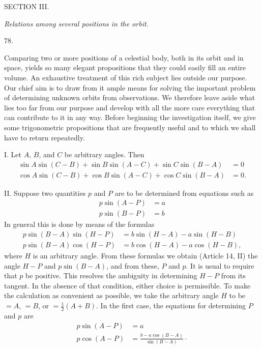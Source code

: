 \clearpage
{}
\begin{center}
{\large SECTION III.}\par\medskip
\emph{Relations among several positions in the orbit.}\par\bigskip
\hypertarget{native-106-article078}{}78.
\end{center}
Comparing two or more positions of a celestial body, both in its orbit and in space, yields so many elegant propositions that they could easily fill an entire volume. An exhaustive treatment of this rich subject lies outside our purpose. Our chief aim is to draw from it ample means for solving the important problem of determining unknown orbits from observations. We therefore leave aside what lies too far from our purpose and develop with all the more care everything that can contribute to it in any way. Before beginning the investigation itself, we give some trigonometric propositions that are frequently useful and to which we shall have to return repeatedly.
\par
I. Let $A$, $B$, and $C$ be arbitrary angles. Then
\[
\begin{aligned}
\sin A\sin(C-B)+\sin B\sin(A-C)+\sin C\sin(B-A)&=0\\
\cos A\sin(C-B)+\cos B\sin(A-C)+\cos C\sin(B-A)&=0.
\end{aligned}
\]
\par
II. Suppose two quantities $p$ and $P$ are to be determined from equations such as
\[
\begin{aligned}
p\sin(A-P)&=a\\
p\sin(B-P)&=b
\end{aligned}
\]
In general this is done by means of the formulas
\[
\begin{aligned}
p\sin(B-A)\sin(H-P)&=b\sin(H-A)-a\sin(H-B)\\
p\sin(B-A)\cos(H-P)&=b\cos(H-A)-a\cos(H-B),
\end{aligned}
\]
where $H$ is an arbitrary angle. From these formulas we obtain (Article 14, II) the angle $H-P$ and $p\sin(B-A)$, and from these, $P$ and $p$. It is usual to require that $p$ be positive. This resolves the ambiguity in determining $H-P$ from its tangent. In the absence of that condition, either choice is permissible. To make the calculation as convenient as possible, we take the arbitrary angle $H$ to be $=A$, $=B$, or $=\tfrac{1}{2}(A+B)$. In the first case, the equations for determining $P$ and $p$ are
\[
\begin{aligned}
p\sin(A-P)&=a\\
p\cos(A-P)&=\frac{b-a\cos(B-A)}{\sin(B-A)}\mathpunct{\cdot}
\end{aligned}
\]
